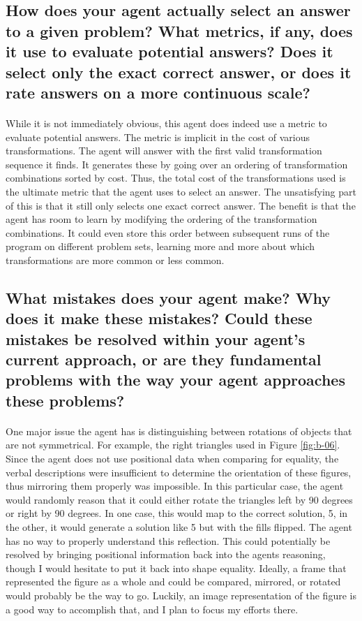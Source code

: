 \documentclass[12pt]{article}
\begin{document}
\subsection{How does your agent actually select an answer to a given problem? What metrics, if any, does it use to evaluate potential answers? Does it select only the exact correct answer, or does it rate answers on a more continuous scale?}
\paragraph{}
While it is not immediately obvious, this agent does indeed use a metric to evaluate potential answers. The metric is implicit in the cost of various transformations. The agent will answer with the first valid transformation sequence it finds. It generates these by going over an ordering of transformation combinations sorted by cost. Thus, the total cost of the transformations used is the ultimate metric that the agent uses to select an answer. The unsatisfying part of this is that it still only selects one exact correct answer. The benefit is that the agent has room to learn by modifying the ordering of the transformation combinations. It could even store this order between subsequent runs of the program on different problem sets, learning more and more about which transformations are more common or less common. 

\subsection{What mistakes does your agent make? Why does it make these mistakes? Could these mistakes be resolved within your agent’s current approach, or are they fundamental problems with the way your agent approaches these problems?}
\paragraph{}
One major issue the agent has is distinguishing between rotations of objects that are not symmetrical. For example, the right triangles used in Figure \ref{fig:b-06}. Since the agent does not use positional data when comparing for equality, the verbal descriptions were insufficient to determine the orientation of these figures, thus mirroring them properly was impossible. In this particular case, the agent would randomly reason that it could either rotate the triangles left by 90 degrees or right by 90 degrees. In one case, this would map to the correct solution, 5, in the other, it would generate a solution like 5 but with the fills flipped. The agent has no way to properly understand this reflection. This could potentially be resolved by bringing positional information back into the agents reasoning, though I would hesitate to put it back into shape equality. Ideally, a frame that represented the figure as a whole and could be compared, mirrored, or rotated would probably be the way to go. Luckily, an image representation of the figure is a good way to accomplish that, and I plan to focus my efforts there. 
\end{document}
